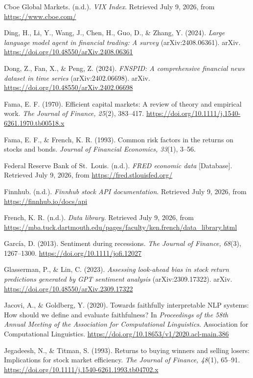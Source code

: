 \documentclass[
  12pt,
]{article}
\begin{document}
Cboe Global Markets. (n.d.). \emph{VIX Index}. Retrieved July 9, 2026,
from \url{https://www.cboe.com/}

Ding, H., Li, Y., Wang, J., Chen, H., Guo, D., \& Zhang, Y. (2024).
\emph{Large language model agent in financial trading: A survey}
(arXiv:2408.06361). arXiv.
\url{https://doi.org/10.48550/arXiv.2408.06361}

Dong, Z., Fan, X., \& Peng, Z. (2024). \emph{FNSPID: A comprehensive
financial news dataset in time series} (arXiv:2402.06698). arXiv.
\url{https://doi.org/10.48550/arXiv.2402.06698}

Fama, E. F. (1970). Efficient capital markets: A review of theory and
empirical work. \emph{The Journal of Finance, 25}(2), 383--417.
\url{https://doi.org/10.1111/j.1540-6261.1970.tb00518.x}

Fama, E. F., \& French, K. R. (1993). Common risk factors in the returns
on stocks and bonds. \emph{Journal of Financial Economics, 33}(1),
3--56.

Federal Reserve Bank of St.~Louis. (n.d.). \emph{FRED economic data}
{[}Database{]}. Retrieved July 9, 2026, from
\url{https://fred.stlouisfed.org/}

Finnhub. (n.d.). \emph{Finnhub stock API documentation}. Retrieved July
9, 2026, from \url{https://finnhub.io/docs/api}

French, K. R. (n.d.). \emph{Data library}. Retrieved July 9, 2026, from
\url{https://mba.tuck.dartmouth.edu/pages/faculty/ken.french/data_library.html}

García, D. (2013). Sentiment during recessions. \emph{The Journal of
Finance, 68}(3), 1267--1300. \url{https://doi.org/10.1111/jofi.12027}

Glasserman, P., \& Lin, C. (2023). \emph{Assessing look-ahead bias in
stock return predictions generated by GPT sentiment analysis}
(arXiv:2309.17322). arXiv.
\url{https://doi.org/10.48550/arXiv.2309.17322}

Jacovi, A., \& Goldberg, Y. (2020). Towards faithfully interpretable NLP
systems: How should we define and evaluate faithfulness? In
\emph{Proceedings of the 58th Annual Meeting of the Association for
Computational Linguistics}. Association for Computational Linguistics.
\url{https://doi.org/10.18653/v1/2020.acl-main.386}

Jegadeesh, N., \& Titman, S. (1993). Returns to buying winners and
selling losers: Implications for stock market efficiency. \emph{The
Journal of Finance, 48}(1), 65--91.
\url{https://doi.org/10.1111/j.1540-6261.1993.tb04702.x}
\end{document}

